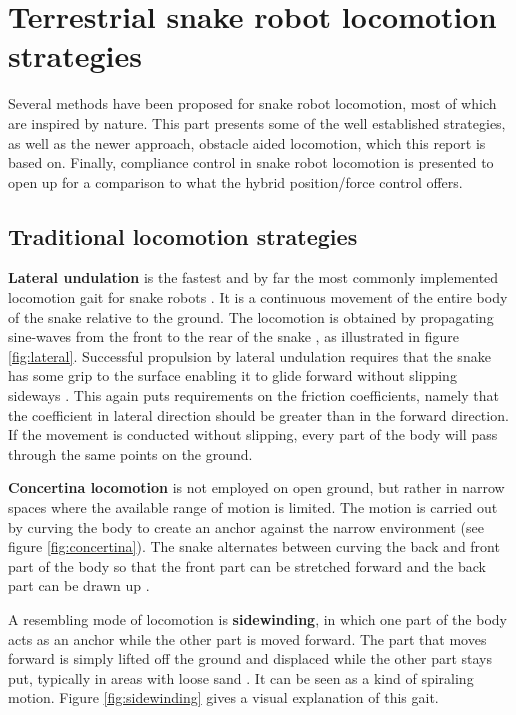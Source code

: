 \section{Terrestrial snake robot locomotion strategies}\label{sec:locomotion}



Several methods have been proposed for snake robot locomotion, most of which are inspired by nature. This part presents some of the well established strategies, as well as the newer approach, obstacle aided locomotion, which this report is based on. Finally, compliance control in snake robot locomotion is presented to open up for a comparison to what the hybrid position/force control offers.

\subsection{Traditional locomotion strategies}\label{subsec:traditional-loco}

\textbf{Lateral undulation} is the fastest and by far the most commonly implemented locomotion gait for snake robots \cite{sanfilippo2017perception}.
It is a continuous movement of the entire body of the snake relative to the ground. The locomotion is obtained by propagating sine-waves from the front to the rear of the snake \cite{transeth2006developments}, as illustrated in figure \ref{fig:lateral}.
Successful propulsion by lateral undulation requires that the snake has some grip to the surface enabling it to glide forward without slipping sideways \cite{liljeback2012review}. This again puts requirements on the friction coefficients, namely that the coefficient in lateral direction should be greater than in the forward
direction. If the movement is conducted without slipping, every part of the body will pass through the same points on the ground.

\textbf{Concertina locomotion} is not employed on open ground, but rather in narrow spaces where the available range of motion is limited. The motion is carried out by curving the body
to create an anchor against the narrow environment (see figure \ref{fig:concertina}). The snake alternates between curving the back and front part of the body so that the front part can be stretched forward and the back part can be drawn up \cite{liljeback2012snake}.

A resembling mode of locomotion is \textbf{sidewinding}, in which one part of the body acts as an anchor while the other part is moved forward. The part that moves forward is simply lifted off the ground and displaced while the other part stays put, typically in areas with loose sand \cite{liljeback2012snake}. It can be seen as a kind of spiraling motion. Figure \ref{fig:sidewinding} gives a visual explanation of this gait.


